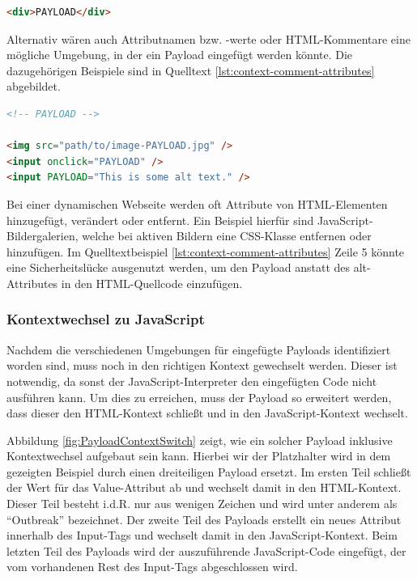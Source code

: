 \begin{lstlisting}[language=HTML,caption={Kontexte: Payload zwischen HTML-Tags},label=lst:context-between-html-tag]
<div>PAYLOAD</div>
\end{lstlisting}
		
		Alternativ wären auch Attributnamen bzw. -werte oder HTML-Kommentare eine mögliche Umgebung, in der ein Payload eingefügt werden könnte. Die dazugehörigen Beispiele sind in Quelltext \ref{lst:context-comment-attributes} abgebildet.
		
\begin{lstlisting}[language=HTML,caption={Kontexte: Payload  in anderen Umgebungen},label=lst:context-comment-attributes]
<!-- PAYLOAD -->

<img src="path/to/image-PAYLOAD.jpg" />
<input onclick="PAYLOAD" />
<input PAYLOAD="This is some alt text." />
\end{lstlisting}
		
		Bei einer dynamischen Webseite werden oft Attribute von HTML-Elementen hinzugefügt, verändert oder entfernt. Ein Beispiel hierfür sind JavaScript-Bildergalerien, welche bei aktiven Bildern eine CSS-Klasse entfernen oder hinzufügen. Im Quelltextbeispiel \ref{lst:context-comment-attributes} Zeile 5 könnte eine Sicherheitslücke ausgenutzt werden, um den Payload anstatt des alt-Attributes in den HTML-Quellcode einzufügen.
		
\subsubsection{Kontextwechsel zu JavaScript}
		
		Nachdem die verschiedenen Umgebungen für eingefügte Payloads identifiziert worden sind, muss noch in den richtigen Kontext gewechselt werden. Dieser ist notwendig, da sonst der JavaScript-Interpreter den eingefügten Code nicht ausführen kann. Um dies zu erreichen, muss der Payload so erweitert werden, dass dieser den HTML-Kontext schließt und in den JavaScript-Kontext wechselt.
		
		Abbildung \ref{fig:PayloadContextSwitch} zeigt, wie ein solcher Payload inklusive Kontextwechsel aufgebaut sein kann. Hierbei wir der Platzhalter wird in dem gezeigten Beispiel durch einen dreiteiligen Payload ersetzt. Im ersten Teil schließt der Wert für das Value-Attribut ab und wechselt damit in den HTML-Kontext. Dieser Teil besteht i.d.R. nur aus wenigen Zeichen und wird unter anderem als ``Outbreak'' bezeichnet.  Der zweite Teil des Payloads erstellt ein neues Attribut innerhalb des Input-Tags und wechselt damit in den JavaScript-Kontext. Beim letzten Teil des Payloads wird der auszuführende JavaScript-Code eingefügt, der vom vorhandenen Rest des Input-Tags abgeschlossen wird.
		
